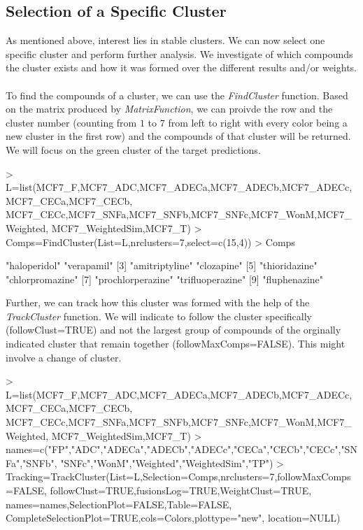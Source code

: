 \documentclass[a4paper]{article}
\begin{document}
\subsection{Selection of a Specific Cluster}
As mentioned above, interest lies in stable clusters. We can now select one
specific cluster and perform further analysis. We investigate of which compounds
the cluster exists and how it was formed over the different results and/or
weights.\\ \\
To find the compounds of a cluster, we can use the {\it FindCluster} function.
Based on the matrix produced by {\it MatrixFunction}, we can proivde the row and
the cluster number (counting from $1$ to $7$ from left to right with every color
being a new cluster in the first row) and the compounds of that cluster will be
returned. We will focus on the green cluster of the target predictions.
\begin{Schunk}
\begin{Sinput}
> L=list(MCF7_F,MCF7_ADC,MCF7_ADECa,MCF7_ADECb,MCF7_ADECc,MCF7_CECa,MCF7_CECb,
        MCF7_CECc,MCF7_SNFa,MCF7_SNFb,MCF7_SNFc,MCF7_WonM,MCF7_Weighted,
        MCF7_WeightedSim,MCF7_T)
> Comps=FindCluster(List=L,nrclusters=7,select=c(15,4))
> Comps
\end{Sinput}
\begin{Soutput}
[1] "haloperidol"      "verapamil"       
[3] "amitriptyline"    "clozapine"       
[5] "thioridazine"     "chlorpromazine"  
[7] "prochlorperazine" "trifluoperazine" 
[9] "fluphenazine"    
\end{Soutput}
\end{Schunk}
Further, we can track how this cluster was formed with the help of the {\it
TrackCluster} function. We will indicate to follow the cluster
specifically (followClust=TRUE) and not the largest group of compounds of the
orginally indicated cluster that remain together (followMaxComps=FALSE). This
might involve a change of cluster.
\begin{Schunk}
\begin{Sinput}
> L=list(MCF7_F,MCF7_ADC,MCF7_ADECa,MCF7_ADECb,MCF7_ADECc,MCF7_CECa,MCF7_CECb,
        MCF7_CECc,MCF7_SNFa,MCF7_SNFb,MCF7_SNFc,MCF7_WonM,MCF7_Weighted,
        MCF7_WeightedSim,MCF7_T)
> names=c("FP","ADC","ADECa","ADECb","ADECc","CECa","CECb","CECc","SNFa","SNFb",
 		"SNFc","WonM","Weighted","WeightedSim","TP")
> Tracking=TrackCluster(List=L,Selection=Comps,nrclusters=7,followMaxComps=FALSE,
                       followClust=TRUE,fusionsLog=TRUE,WeightClust=TRUE,
                       names=names,SelectionPlot=FALSE,Table=FALSE,
                       CompleteSelectionPlot=TRUE,cols=Colors,plottype="new",
                       location=NULL)
\end{Sinput}
\end{Schunk}
\end{document}
